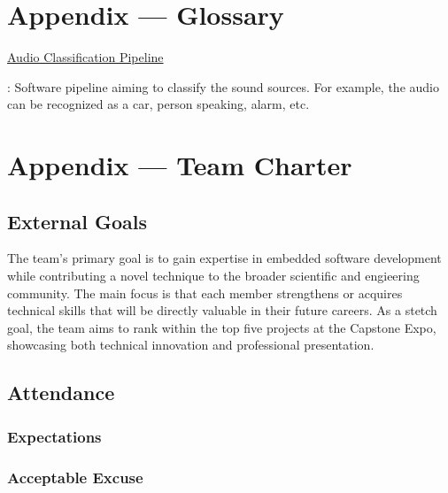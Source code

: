 \documentclass{article}
\begin{document}
\newpage{}

\section*{Appendix --- Glossary}


\hypertarget{audio_classification_pipeline}{\underline{Audio Classification Pipeline}}: 
Software pipeline aiming to classify the sound sources.
For example, the audio can be recognized as a car, person speaking, alarm, etc.

\newpage{}

\section*{Appendix --- Team Charter}

\subsection*{External Goals}

The team's primary goal is to gain expertise in embedded software development while contributing a novel technique to the broader scientific and engieering community.
The main focus is that each member strengthens or acquires technical skills that will be directly valuable in their future careers.
As a stetch goal, the team aims to rank within the top five projects at the Capstone Expo, showcasing both technical innovation and professional presentation.

\subsection*{Attendance}

\subsubsection*{Expectations}


\subsubsection*{Acceptable Excuse}

\end{document}
